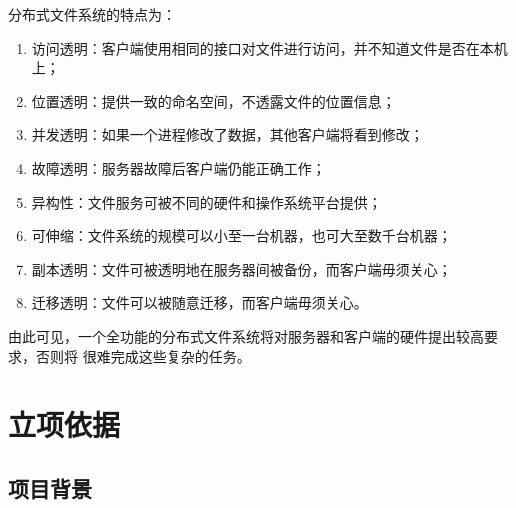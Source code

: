 \documentclass{ctexart}
\begin{document}
分布式文件系统的特点为：
\begin{enumerate}
\item 访问透明：客户端使用相同的接口对文件进行访问，并不知道文件是否在本机上；
\item 位置透明：提供一致的命名空间，不透露文件的位置信息；
\item 并发透明：如果一个进程修改了数据，其他客户端将看到修改；
\item 故障透明：服务器故障后客户端仍能正确工作；
\item 异构性：文件服务可被不同的硬件和操作系统平台提供；
\item 可伸缩：文件系统的规模可以小至一台机器，也可大至数千台机器；
\item 副本透明：文件可被透明地在服务器间被备份，而客户端毋须关心；
\item 迁移透明：文件可以被随意迁移，而客户端毋须关心。
\end{enumerate}

由此可见，一个全功能的分布式文件系统将对服务器和客户端的硬件提出较高要求，否则将
很难完成这些复杂的任务。

\section{立项依据}
\subsection{项目背景}
\end{document}
